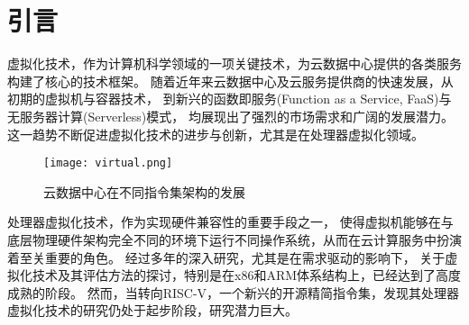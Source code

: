 \chapter{引言}




虚拟化技术，作为计算机科学领域的一项关键技术，为云数据中心提供的各类服务构建了核心的技术框架。
随着近年来云数据中心及云服务提供商的快速发展，从初期的虚拟机与容器技术，
到新兴的函数即服务(Function as a Service, FaaS)与无服务器计算(Serverless)模式，
均展现出了强烈的市场需求和广阔的发展潜力。
这一趋势不断促进虚拟化技术的进步与创新，尤其是在处理器虚拟化领域。

\begin{figure}[htbp]
\centering
\texttt{[image: virtual.png]}
\caption{云数据中心在不同指令集架构的发展}
\end{figure}

处理器虚拟化技术，作为实现硬件兼容性的重要手段之一，
使得虚拟机能够在与底层物理硬件架构完全不同的环境下运行不同操作系统，从而在云计算服务中扮演着至关重要的角色。
经过多年的深入研究，尤其是在需求驱动的影响下，
关于虚拟化技术及其评估方法的探讨，特别是在x86和ARM体系结构上，已经达到了高度成熟的阶段。
然而，当转向RISC-V，一个新兴的开源精简指令集，发现其处理器虚拟化技术的研究仍处于起步阶段，研究潜力巨大。

